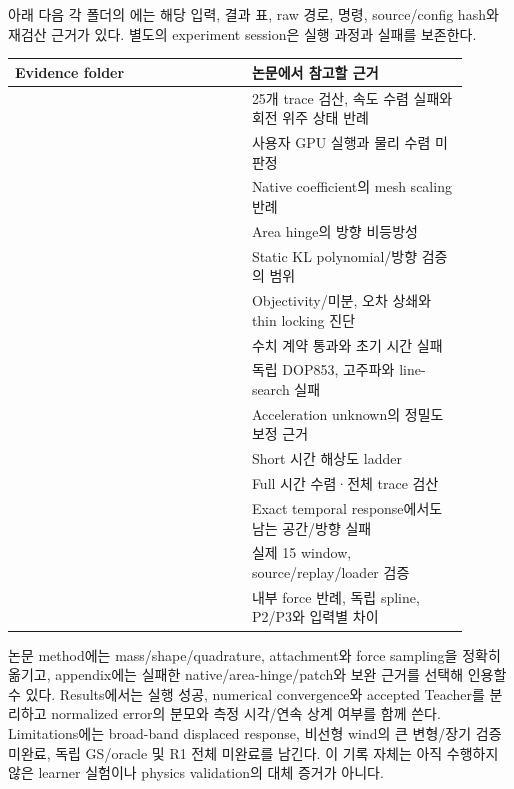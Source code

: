 \documentclass[10pt]{article}
\begin{document}
 아래 다음 각 폴더의 에는 해당 입력, 결과 표, raw 경로,
명령, source/config hash와 재검산 근거가 있다. 별도의 experiment session은 실행 과정과 실패를 보존한다.
\begin{longtable}{L{0.47\linewidth}L{0.43\linewidth}}
\toprule Evidence folder & 논문에서 참고할 근거\\\midrule
{} & 25개 trace 검산, 속도 수렴 실패와 회전 위주 상태 반례\\
 & 사용자 GPU 실행과 물리 수렴 미판정\\
 & Native coefficient의 mesh scaling 반례\\
 & Area hinge의 방향 비등방성\\
 & Static KL polynomial/방향 검증의 범위\\
 & Objectivity/미분, 오차 상쇄와 thin locking 진단\\
 & 수치 계약 통과와 초기 시간 실패\\
 & 독립 DOP853, 고주파와 line-search 실패\\
 & Acceleration unknown의 정밀도 보정 근거\\
 & Short 시간 해상도 ladder\\
 & Full 시간 수렴·전체 trace 검산\\
 & Exact temporal response에서도 남는 공간/방향 실패\\
 & 실제 15 window, source/replay/loader 검증\\
 & 내부 force 반례, 독립 spline, P2/P3와 입력별 차이\\
\bottomrule\end{longtable}

논문 method에는 mass/shape/quadrature, attachment와 force sampling을 정확히 옮기고,
appendix에는 실패한 native/area-hinge/patch와 보완 근거를 선택해 인용할 수 있다.
Results에서는 실행 성공, numerical convergence와 accepted Teacher를 분리하고 normalized error의
분모와 측정 시각/연속 상계 여부를 함께 쓴다. Limitations에는 broad-band displaced response,
비선형 wind의 큰 변형/장기 검증 미완료, 독립 GS/oracle 및 R1 전체 미완료를 남긴다.
이 기록 자체는 아직 수행하지 않은 learner 실험이나 physics validation의 대체 증거가 아니다.
\end{document}
